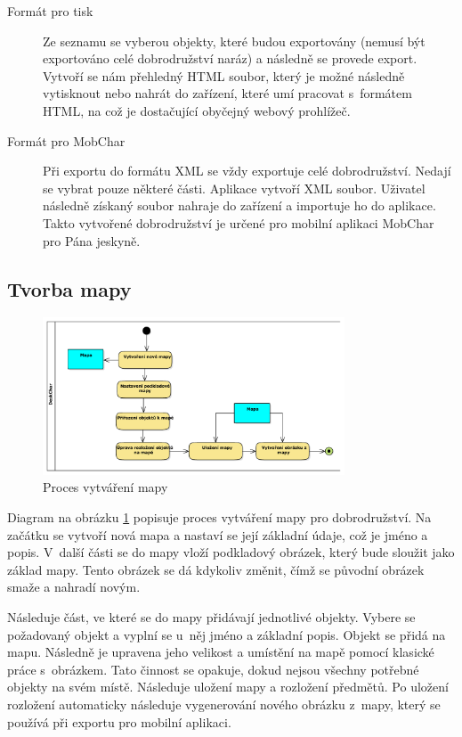 \documentclass[thesis=B,czech]{resources/FITthesis}[2012/06/26]
\begin{document}
\begin{description}

\item[Formát pro tisk] Ze seznamu se vyberou objekty, které budou exportovány (nemusí být exportováno celé dobrodružství naráz) a následně se provede export. Vytvoří se nám přehledný HTML soubor, který je možné následně vytisknout nebo nahrát do zařízení, které umí pracovat s~formátem HTML, na což je dostačující obyčejný webový prohlížeč.

\item[Formát pro MobChar] Při exportu do formátu XML se vždy exportuje celé dobrodružství. Nedají se vybrat pouze některé části. Aplikace vytvoří XML soubor. Uživatel následně získaný soubor nahraje do zařízení a importuje ho do aplikace. Takto vytvořené dobrodružství je určené pro mobilní aplikaci MobChar pro Pána jeskyně.

\end{description}

\subsection{Tvorba mapy}
\begin{figure}\centering
	\includegraphics[width=0.8\textwidth]{images/business_mapa}
	\caption[Proces vytváření mapy]{Proces vytváření mapy}\label{fig:bp_mapa}
\end{figure}	
Diagram na obrázku \ref{fig:bp_mapa} popisuje proces vytváření mapy pro dobrodružství. Na začátku se vytvoří nová mapa a nastaví se její základní údaje, což je jméno a popis. V~další části se do mapy vloží podkladový obrázek, který bude sloužit jako základ mapy. Tento obrázek se dá kdykoliv změnit, čímž se původní obrázek smaže a nahradí novým. \par

Následuje část, ve které se do mapy přidávají jednotlivé objekty. Vybere se požadovaný objekt a vyplní se u~něj jméno a základní popis. Objekt se přidá na mapu. Následně je upravena jeho velikost a umístění na mapě pomocí klasické práce s~obrázkem. Tato činnost se opakuje, dokud nejsou všechny potřebné objekty na svém místě. Následuje uložení mapy a rozložení předmětů. Po uložení rozložení automaticky následuje vygenerování nového obrázku z~mapy, který se používá při exportu pro mobilní aplikaci.
\end{document}
